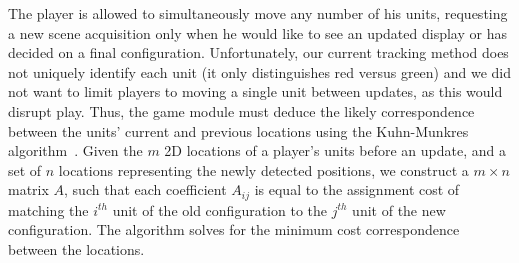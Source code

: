 \documentclass[10pt,twocolumn,letterpaper]{article}
\begin{document}
%
The player is allowed to simultaneously move any number of his units,
requesting a new scene acquisition only when he would like to see an
updated display or has decided on a final configuration.
Unfortunately, our current tracking method does not uniquely identify
each unit (it only distinguishes red versus green) and we did not
want to limit players to moving a single unit between updates, as this
would disrupt play.
%
Thus, the game module must deduce the likely correspondence between
the units' current and previous locations using the Kuhn-Munkres
algorithm~\cite{Kuhn1955,Munkres1957}.
%
%
Given the $m$ 2D locations of 
a player's units before an update, and a set of $n$ locations
representing the newly detected positions,
we construct a $m \times n$ matrix
$A$, such that each coefficient $A_{ij}$ is equal to the assignment
cost of matching the $ i^{th} $ unit of the old configuration to the $
j^{th} $ unit of the new configuration.  
The algorithm
solves for the minimum cost correspondence between the locations.
%
\end{document}
